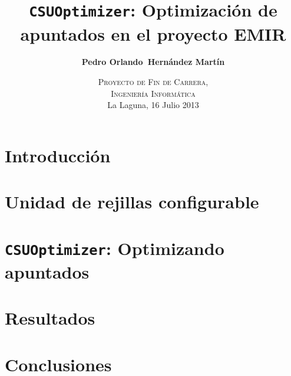 \documentclass[10pt,xcolor=svgnames]{beamer}
\title{\textbf{\texttt{CSUOptimizer}: Optimización de apuntados en el proyecto EMIR}}
\author[Hernández Martín]{%
  \textbf{Pedro Orlando~Hernández Martín}}
\institute[Universidad de La Laguna]{
}
\date[PFC-2013]{\textsc{Proyecto de Fin de Carrera,\\
                        Ingeniería Informática} \\
                        La Laguna, 16 Julio 2013}
\begin{document}
\newcommand{\CSUO}{\texttt{CSUOptimizer}{}}          

\frame{\titlepage}


\section{Introducción}
\section{Unidad de rejillas configurable}
	  
\section{\CSUO{}: Optimizando apuntados}
	  
\section{Resultados}
	  
\section{Conclusiones}
	  
\frame{\titlepage}
\end{document}
